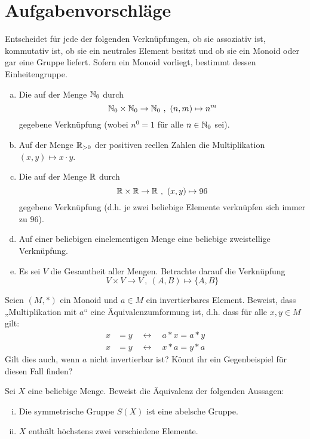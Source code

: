 \newpage
\section{Aufgabenvorschläge}




\begin{aufg} \label{verkbsp}
Entscheidet für jede der folgenden Verknüpfungen, ob sie assoziativ ist, kommutativ ist, ob sie ein neutrales Element besitzt und ob sie ein Monoid oder gar eine Gruppe liefert. Sofern ein Monoid vorliegt, bestimmt dessen Einheitengruppe.
\begin{enumerate}[a)]
 \item Die auf der Menge ${\mathbb N}_0$ durch
 \[ {\mathbb N}_0 \times {\mathbb N}_0 \to {\mathbb N}_0 \ ,\ (n,m) \mapsto n^m \]
 gegebene Verknüpfung (wobei $n^0=1$ für alle $n\in {\mathbb N}_0$ sei).
 \item Auf der Menge ${\mathbb R}_{>0}$ der positiven reellen Zahlen die Multiplikation $(x,y)\mapsto x\cdot y$.
 \item Die auf der Menge ${\mathbb R}$ durch
 \[ {\mathbb R}\times {\mathbb R} \to {\mathbb R} \ ,\ (x,y) \mapsto 96 \]
 gegebene Verknüpfung (d.h. je zwei beliebige Elemente verknüpfen sich immer zu $96$).
\item Auf einer beliebigen einelementigen Menge eine beliebige zweistellige Verknüpfung.
 \item Es sei $V$ die Gesamtheit aller Mengen. Betrachte darauf die Verknüpfung
 \[ V\times V\to V \ ,\ (A,B) \mapsto \{A,B\} \]
\end{enumerate}
\end{aufg}




\begin{aufg}
Seien $(M,*)$ ein Monoid und $a\in M$ ein invertierbares Element. Beweist, dass „Multiplikation mit $a$“ eine Äquivalenzumformung ist, d.h. dass für alle $x,y\in M$ gilt:
\begin{align*}
x&=y \quad \leftrightarrow\quad a*x=a*y \\
x&=y \quad \leftrightarrow\quad x*a=y*a
\end{align*}
Gilt dies auch, wenn $a$ nicht invertierbar ist? Könnt ihr ein Gegenbeispiel für diesen Fall finden?
\end{aufg}





\begin{aufg}
Sei $X$ eine beliebige Menge. Beweist die Äquivalenz der folgenden Aussagen:
\begin{enumerate}[(i)]
 \item Die symmetrische Gruppe $S(X)$ ist eine abelsche Gruppe.
 \item $X$ enthält höchstens zwei verschiedene Elemente.
\end{enumerate}
\end{aufg}



